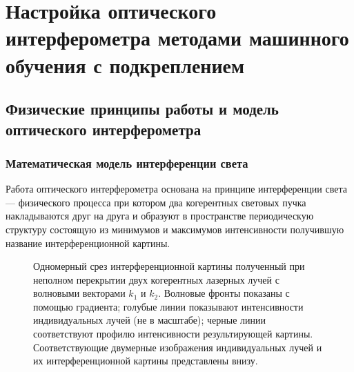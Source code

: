\chapter{Настройка оптического интерферометра методами машинного обучения с подкреплением}\label{ch:ch2}

\section{Физические принципы работы и модель оптического интерферометра}\label{sec:ch2/sec1}

\subsection{Математическая модель интерференции света}

Работа оптического интерферометра основана на принципе интерференции света --- физического процесса при котором два когерентных световых пучка накладываются друг на друга и образуют в пространстве периодическую структуру состоящую из минимумов и максимумов интенсивности получившую название интерференционной картины. 

\begin{figure}[ht]
    \caption{Одномерный срез интерференционной картины полученный при неполном перекрытии двух когерентных лазерных лучей с волновыми векторами $k_1$ и $k_2$. Волновые фронты показаны с помощью градиента; голубые линии показывают интенсивности индивидуальных лучей (не в масштабе); черные линии соответствуют профилю интенсивности результирующей картины. Соответствующие двумерные изображения индивидуальных лучей и их интерференционной картины представлены внизу.}\label{fig:two_beam_interf}
\end{figure}

